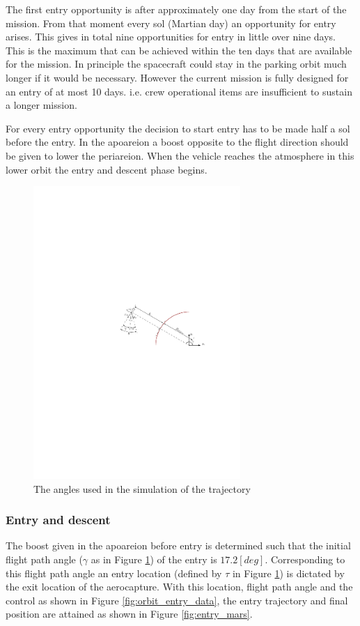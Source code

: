 The first entry opportunity is after approximately one day from the start of the mission. From that moment every sol (Martian day) an opportunity for entry arises. This gives in total nine opportunities for entry in little over nine days. This is the maximum that can be achieved within the ten days that are available for the mission. In principle the spacecraft could stay in the parking orbit much longer if it would be necessary. However the current mission is fully designed for an entry of at most 10 days. i.e. crew operational items are insufficient to sustain a longer mission.

For every entry opportunity the decision to start entry has to be made half a sol before the entry. In the apoareion a boost opposite to the flight direction should be given to lower the periareion.  When the vehicle reaches the atmosphere in this lower orbit the entry and descent phase begins.

\begin{figure}[h]
	\centering
	\includegraphics[width=0.7\textwidth]{Figure/Orbit/angles.pdf}
	\caption{The angles used in the simulation of the trajectory}
	\label{fig:angles}
\end{figure}

\subsubsection{Entry and descent}\label{sec:entry_descent}
The boost given in the apoareion before entry is determined such that the initial flight path angle ($\gamma$ as in Figure \ref{fig:angles}) of the entry is $17.2 \left[deg\right]$. Corresponding to this flight path angle an entry location (defined by $\tau$ in Figure \ref{fig:angles}) is dictated by the exit location of the aerocapture. With this location, flight path angle and the control as shown in Figure \ref{fig:orbit_entry_data}, the entry trajectory and final position are attained as shown in Figure \ref{fig:entry_mars}.

